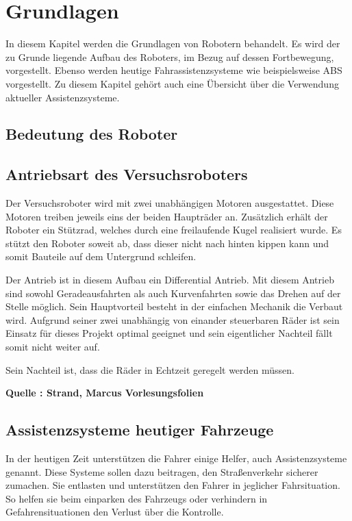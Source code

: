 \chapter{Grundlagen}
In diesem Kapitel werden die Grundlagen von Robotern behandelt. Es wird der zu Grunde liegende Aufbau des Roboters, im Bezug auf dessen Fortbewegung, vorgestellt. Ebenso werden heutige Fahrassistenzsysteme wie beispielsweise ABS vorgestellt. Zu diesem Kapitel gehört auch eine Übersicht über die Verwendung aktueller Assistenzsysteme.
\section{Bedeutung des Roboter}

\section{Antriebsart des Versuchsroboters} \label{lab:Antriebsart}
Der Versuchsroboter wird mit zwei unabhängigen Motoren ausgestattet. Diese Motoren treiben jeweils eins der beiden Haupträder an. Zusätzlich erhält der Roboter ein Stützrad, welches durch eine freilaufende Kugel realisiert wurde. Es stützt den Roboter soweit ab, dass dieser nicht nach hinten kippen kann und somit Bauteile auf dem Untergrund schleifen.

Der Antrieb ist in diesem Aufbau ein Differential Antrieb. Mit diesem Antrieb sind sowohl Geradeausfahrten als auch Kurvenfahrten sowie das Drehen auf der Stelle möglich. Sein Hauptvorteil besteht in der einfachen Mechanik die Verbaut wird. Aufgrund seiner zwei unabhängig von einander steuerbaren Räder ist sein Einsatz für dieses Projekt optimal geeignet und sein eigentlicher Nachteil fällt somit nicht weiter auf.
 
Sein Nachteil ist, dass die Räder in Echtzeit geregelt werden müssen.  

\textbf{Quelle : Strand, Marcus Vorlesungsfolien } 

\section{Assistenzsysteme heutiger Fahrzeuge}
In der heutigen Zeit unterstützen die Fahrer einige Helfer, auch Assistenzsysteme genannt. Diese Systeme sollen dazu beitragen, den Straßenverkehr sicherer zumachen. Sie entlasten und unterstützen den Fahrer in jeglicher Fahrsituation. So helfen sie beim einparken des Fahrzeugs oder verhindern in Gefahrensituationen den Verlust über die Kontrolle.

